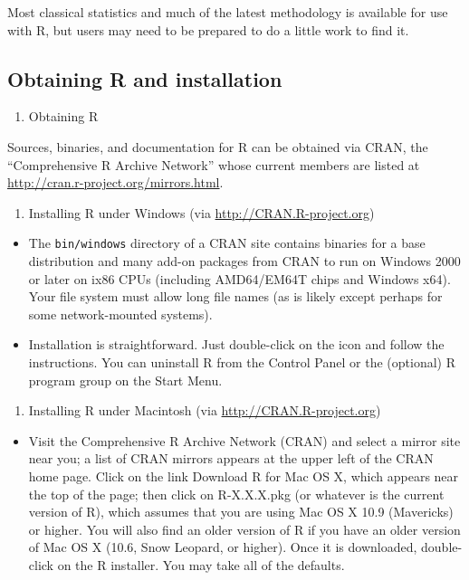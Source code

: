 \documentclass[]{book}
\providecommand{\tightlist}{%
  \setlength{\itemsep}{0pt}\setlength{\parskip}{0pt}}
\begin{document}
Most classical statistics and much of the latest methodology is
available for use with R, but users may need to be prepared to do a
little work to find it.

\subsection{Obtaining R and
installation}\label{obtaining-r-and-installation}

\begin{enumerate}
\def\labelenumi{\arabic{enumi}.}
\tightlist
\item
  Obtaining R
\end{enumerate}

Sources, binaries, and documentation for R can be obtained via CRAN, the
``Comprehensive R Archive Network'' whose current members are listed at
\url{http://cran.r-project.org/mirrors.html}.

\begin{enumerate}
\def\labelenumi{\arabic{enumi}.}
\setcounter{enumi}{1}
\tightlist
\item
  Installing R under Windows (via \url{http://CRAN.R-project.org})
\end{enumerate}

\begin{itemize}
\tightlist
\item
  The \texttt{bin/windows} directory of a CRAN site contains binaries
  for a base distribution and many add-on packages from CRAN to run on
  Windows 2000 or later on ix86 CPUs (including AMD64/EM64T chips and
  Windows x64). Your file system must allow long file names (as is
  likely except perhaps for some network-mounted systems).
\item
  Installation is straightforward. Just double-click on the icon and
  follow the instructions. You can uninstall R from the Control Panel or
  the (optional) R program group on the Start Menu.
\end{itemize}

\begin{enumerate}
\def\labelenumi{\arabic{enumi}.}
\setcounter{enumi}{2}
\tightlist
\item
  Installing R under Macintosh (via \url{http://CRAN.R-project.org})
\end{enumerate}

\begin{itemize}
\tightlist
\item
  Visit the Comprehensive R Archive Network (CRAN) and select a mirror
  site near you; a list of CRAN mirrors appears at the upper left of the
  CRAN home page. Click on the link Download R for Mac OS X, which
  appears near the top of the page; then click on R-X.X.X.pkg (or
  whatever is the current version of R), which assumes that you are
  using Mac OS X 10.9 (Mavericks) or higher. You will also find an older
  version of R if you have an older version of Mac OS X (10.6, Snow
  Leopard, or higher). Once it is downloaded, double-click on the R
  installer. You may take all of the defaults.
\end{itemize}
\end{document}
